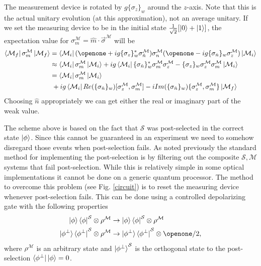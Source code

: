 \documentclass[aps,pra,12pt,onecolumn,showpacs,superscriptaddress,floatfix,footinbib,subfigure]{revtex4}
\def\bra#1{\mathinner{\langle{#1}|}}
\def\ket#1{\mathinner{|{#1}\rangle}}
\def\es{{\mathcal{S}}}
\def\md{{\mathcal{M}}}
\def\sm{{\es,\md}}
\def\sn{ \sigma_{ \hat{n} } }
\def\kb#1{\ket{#1}\bra{#1}}
\begin{document}
The measurement device is rotated by $g\{\sigma_z\}_w$ around the $z$-axis.  Note that this is the actual unitary evolution (at this approximation), not an average unitary.  If we set the measuring device to be in the initial state $\frac{1}{\sqrt{2}}[\ket{0}+\ket{1}]$,  the  expectation value for $\sigma_m^\md=\hat{m}\cdot\vec{\sigma}^\md$ will be
\begin{align}\label{readout}
\bra{\md_f}\sigma_m^\md\ket{\md_f}&=\bra{\md_i}(\openone+ig\{\sigma_z\}_w^*\sn^\md)\sigma_n^\md(\openone-ig\{\sn\}_w\sigma_z^\md)\ket{\md_i}\\&\approx\bra{\md_i}\sigma_m^\md\ket{\md_i}+ig\bra{\md_i}\{\sn\}_w^*\sigma_m^\md\sigma_z^\md-\{\sigma_z\}_w\sigma_z^\md\sigma_m^\md\ket{\md_i}\\
\label{ReIm}&=\bra{\md_i}\sigma_m^\md\ket{\md_i}\\&\;+ig\bra{\md_i}Re(\{\sn\}_w)[\sigma_z^\md,\sigma_m^\md]-iIm(\{\sn\}_w)\{\sigma_z^\md,\sigma_m^\md\}\ket{\md_f}\nonumber
\end{align}
Choosing $\hat{n}$ appropriately we can get either the real or imaginary part of the weak value.

The scheme above is based on the fact that $\es$ was post-selected in the correct state $\ket{\phi}$. Since this cannot be guaranteed in an experiment we need to somehow disregard those events when post-selection fails.  As noted previously the standard method for implementing the post-selection is by filtering out the composite $\sm$ systems that fail post-selection. While this is relatively simple in some optical implementations it  cannot be done on a generic quantum processor. The method to overcome this problem (see Fig. \ref{circuit}) is to reset the measuring device whenever post-selection fails. This can be  done using a controlled depolarizing gate with the following properties
\begin{align}\label{Cdepol}
\ket{\phi}\bra{\phi}^\es\otimes\rho^\md&\rightarrow \ket{\phi}\bra{\phi}^\es\otimes\rho^\md \nonumber\\
\kb{\phi^\perp}^\es\otimes\rho^\md &\rightarrow \kb{\phi^\perp}^\es\otimes\openone/2,
\end{align}
where  $\rho^\md$ is an arbitrary state and $\ket{\phi^\perp}^\es$ is the orthogonal state to the post-selection  $\bra{\phi^\perp}\ket{\phi}=0$.
\end{document}
